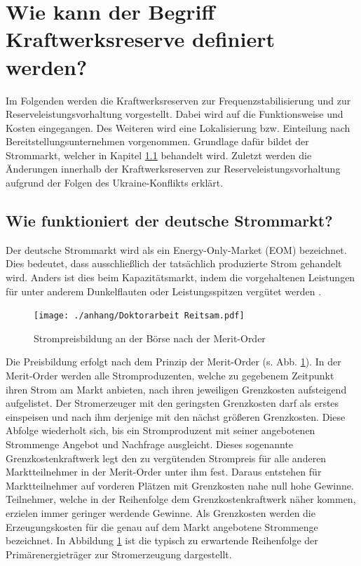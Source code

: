 \section{Wie kann der Begriff Kraftwerksreserve definiert werden?}

	Im Folgenden werden die Kraftwerksreserven zur Frequenzstabilisierung und zur Reserveleistungsvorhaltung vorgestellt.
	Dabei wird auf die Funktionsweise und Kosten eingegangen.
	Des Weiteren wird eine Lokalisierung bzw. Einteilung nach Bereitstellungsunternehmen vorgenommen.
	Grundlage dafür bildet der Strommarkt, welcher in Kapitel \ref{sect: Wie funktioniert der deutsche Strommarkt?} behandelt wird.
	Zuletzt werden die Änderungen innerhalb der Kraftwerksreserven zur Reserveleistungsvorhaltung aufgrund der Folgen des Ukraine-Konflikts erklärt.

	\subsection{Wie funktioniert der deutsche Strommarkt?} \label{sect: Wie funktioniert der deutsche Strommarkt?}
	
		Der deutsche Strommarkt wird als ein Energy-Only-Market (EOM) bezeichnet.
		Dies bedeutet, dass ausschließlich der tatsächlich produzierte Strom gehandelt wird.
		Anders ist dies beim Kapazitätsmarkt, indem die vorgehaltenen Leistungen für unter anderem Dunkelflauten oder Leistungsspitzen vergütet werden \cite{haucap}.
	
		\begin{figure} [H]
			\centering
			\label{Abb. Strompreisbildung Merit Order ohne EE}
			\texttt{[image: ./anhang/Doktorarbeit Reitsam.pdf]}
			\caption{Strompreisbildung an der Börse nach der Merit-Order \parencite{Doktorarbeit_Reitsam}}
		\end{figure}
	
		Die Preisbildung erfolgt nach dem Prinzip der Merit-Order (s. Abb. \ref{Abb. Strompreisbildung Merit Order ohne EE}).
		In der Merit-Order werden alle Stromproduzenten, welche zu gegebenem Zeitpunkt ihren Strom am Markt anbieten, nach ihren jeweiligen Grenzkosten aufsteigend aufgelistet.
		Der Stromerzeuger mit den geringsten Grenzkosten darf als erstes einspeisen und nach ihm derjenige mit den nächst größeren Grenzkosten.
		Diese Abfolge wiederholt sich, bis ein Stromproduzent mit seiner angebotenen Strommenge Angebot und Nachfrage ausgleicht.
		Dieses sogenannte Grenzkostenkraftwerk legt den zu vergütenden Strompreis für alle anderen Marktteilnehmer in der Merit-Order unter ihm fest.
		Daraus entstehen für Marktteilnehmer auf vorderen Plätzen mit Grenzkosten nahe null hohe Gewinne.
		Teilnehmer, welche in der Reihenfolge dem Grenzkostenkraftwerk näher kommen, erzielen immer geringer werdende Gewinne.
		Als Grenzkosten werden die Erzeugungskosten für die genau auf dem Markt angebotene Strommenge bezeichnet.
		In Abbildung \ref{Abb. Strompreisbildung Merit Order ohne EE} ist die typisch zu erwartende Reihenfolge der Primärenergieträger zur Stromerzeugung dargestellt. 
		
